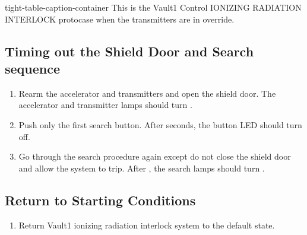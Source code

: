 \documentclass[letterpaper,10pt,english]{sphinxmanual}
\begin{document}
\begin{sphinxuseclass}{tight-table-caption-container}
\sphinxAtStartPar
{} This is the Vault\sphinxhyphen{}1 Control IONIZING RADIATION INTERLOCK protocase when the transmitters are in override.

\end{sphinxuseclass}

\subsection{Timing out the Shield Door and Search sequence}
\label{\detokenize{testing_documentation/Vault-1_ionizing_radiation:timing-out-the-shield-door-and-search-sequence}}\begin{enumerate}
%
\item {} 
\sphinxAtStartPar
Rearm the accelerator and transmitters and open the shield door.
The accelerator and transmitter lamps should turn .

\item {} 
\sphinxAtStartPar
Push only the first search button.
After  seconds, the button LED should turn off.

\item {} 
\sphinxAtStartPar
Go through the search procedure again except do not close the shield door and allow the system to trip.
After , the search lamps should turn .

\end{enumerate}


\subsection{Return to Starting Conditions}
\label{\detokenize{testing_documentation/Vault-1_ionizing_radiation:return-to-starting-conditions}}\begin{enumerate}
%
\item {} 
\sphinxAtStartPar
Return Vault\sphinxhyphen{}1 ionizing radiation interlock system to the default state.

\end{enumerate}

\sphinxstepscope
\end{document}

